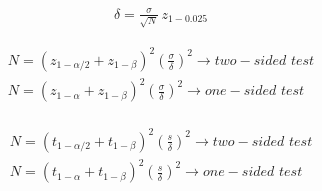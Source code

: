 \documentclass[12pt]{article}
\begin{document}
\pagestyle{empty}
\Large
{}
\pagecolor{ehandbook}

\boldmath
\begin{eqnarray*}
\delta = \frac{\sigma}{\sqrt{N}} \, z_{1 - 0.025}
\end{eqnarray*}

\hspace*{.25in}

\begin{eqnarray*}
N = (z_{1-\alpha/2} + z_{1-\beta})^2 \left( \frac{\sigma}{\delta} \right)^2 \rightarrow two-sided \,\, test \\
N = (z_{1-\alpha} + z_{1-\beta})^2 \left( \frac{\sigma}{\delta} \right)^2 \rightarrow one-sided \,\, test\\
\end{eqnarray*}

\hspace*{.25in}

\begin{eqnarray*}
N = (t_{1-\alpha/2} + t_{1-\beta})^2 \left( \frac{s}{\delta} \right)^2 \rightarrow two-sided \,\, test \\
N = (t_{1-\alpha} + t_{1-\beta})^2 \left( \frac{s}{\delta} \right)^2 \rightarrow one-sided \,\, test\\
\end{eqnarray*}
\end{document}
